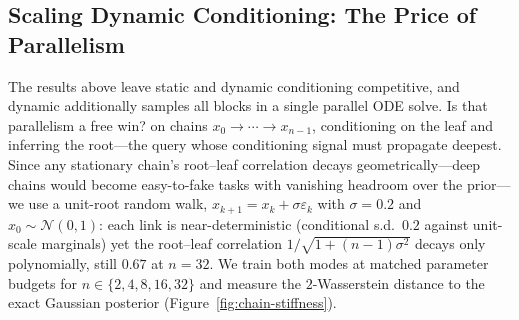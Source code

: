 \subsection{Scaling Dynamic Conditioning: The Price of Parallelism}
\label{sec:chain-stiffness}

The results above leave static and dynamic conditioning competitive, and dynamic additionally samples all blocks in a single parallel ODE solve. Is that parallelism a free win?  on chains $x_0 \to \cdots \to x_{n-1}$, conditioning on the leaf and inferring the root---the query whose conditioning signal must propagate deepest. Since any stationary chain's root--leaf correlation decays geometrically---deep chains would become easy-to-fake tasks with vanishing headroom over the prior---we use a unit-root random walk, $x_{k+1} = x_k + \sigma\varepsilon_k$ with $\sigma = 0.2$ and $x_0 \sim \mathcal{N}(0,1)$: each link is near-deterministic (conditional s.d.\ $0.2$ against unit-scale marginals) yet the root--leaf correlation $1/\sqrt{1 + (n{-}1)\sigma^2}$ decays only polynomially, still $0.67$ at $n{=}32$. We train both modes at matched parameter budgets for $n \in \{2, 4, 8, 16, 32\}$ and measure the $2$-Wasserstein distance to the exact Gaussian posterior (Figure~\ref{fig:chain-stiffness}).

